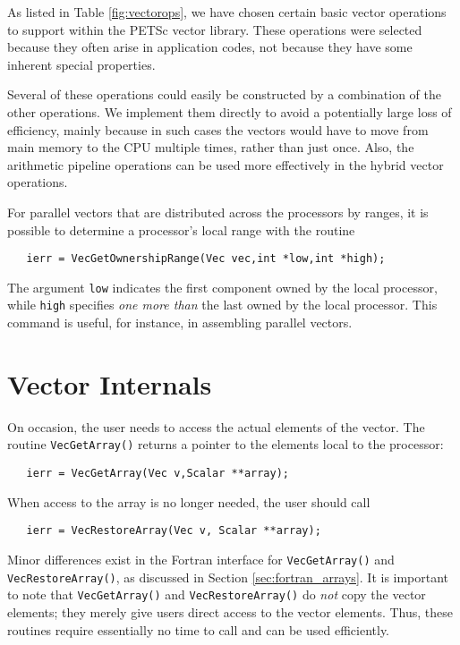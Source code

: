 As listed in Table \ref{fig:vectorops}, we have chosen certain 
basic vector operations to support within the PETSc vector library.
These operations were selected because they often arise in application 
codes, not because they have some inherent special properties. 

Several of these operations could easily be constructed by a
combination of the other operations.  We implement them directly to
avoid a potentially large loss of efficiency, mainly because in such
cases the vectors would have to move from main memory to the CPU
multiple times, rather than just once.  Also, the arithmetic pipeline
operations can be used more effectively in the hybrid vector
operations.

For parallel vectors that are distributed across the processors by ranges, 
it is possible to determine 
a processor's local range with the routine
\begin{verbatim}
   ierr = VecGetOwnershipRange(Vec vec,int *low,int *high);
\end{verbatim}
The argument {\tt low} indicates the first component owned by the local 
processor, while {\tt high} specifies {\em one more than} the 
last owned by the local processor.
This command is useful, for instance, in assembling parallel vectors.

\section{Vector Internals}
\label{sec:vecinternal}

On occasion, the user needs to access the actual elements of the vector. 
The routine {\tt VecGetArray()} 
returns a pointer to the elements local to the processor:
\begin{verbatim}
   ierr = VecGetArray(Vec v,Scalar **array);
\end{verbatim}
When access to the array is no longer
needed, the user should call
\begin{verbatim}
   ierr = VecRestoreArray(Vec v, Scalar **array);
\end{verbatim}
Minor differences exist in the Fortran interface for {\tt VecGetArray()} and 
{\tt VecRestoreArray()}, as discussed in Section \ref{sec:fortran_arrays}.  
It is important to note that {\tt VecGetArray()} and {\tt VecRestoreArray()}
do {\em not} copy the vector elements; they merely give users direct
access to the vector elements. Thus, these routines require essentially
no time to call and can be used efficiently.

